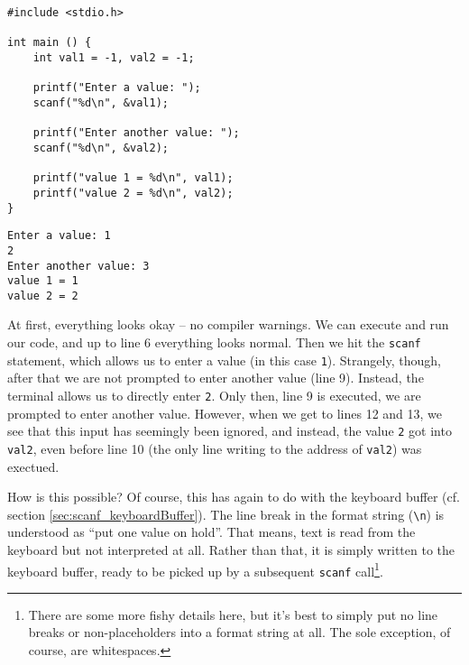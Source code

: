 {\begin{tcbraster}[raster columns=2,
                  raster equal height,
                  nobeforeafter,
                  raster column skip=0.2cm]
\begin{warnbox}[linebreakScanf.c, leftupper=7mm]
\begin{verbatim}
#include <stdio.h>

int main () {
    int val1 = -1, val2 = -1;

    printf("Enter a value: ");
    scanf("%d\n", &val1);

    printf("Enter another value: ");
    scanf("%d\n", &val2);

    printf("value 1 = %d\n", val1);
    printf("value 2 = %d\n", val2);
}
\end{verbatim}
\end{warnbox}
%
\begin{cmdbox}
\begin{verbatim}
Enter a value: 1
2
Enter another value: 3
value 1 = 1
value 2 = 2
\end{verbatim}
\end{cmdbox}
\end{tcbraster}

At first, everything looks okay -- no compiler warnings. We can execute and run our code, and up to line 6 everything looks normal. Then we hit the \texttt{scanf} statement, which allows us to enter a value (in this case \texttt{1}). Strangely, though, after that we are not prompted to enter another value (line 9). Instead, the terminal allows us to directly enter \texttt{2}. Only then, line 9 is executed, \ie we are prompted to enter another value. However, when we get to lines 12 and 13, we see that this input has seemingly been ignored, and instead, the value \texttt{2} got into \texttt{val2}, even before line 10 (the only line writing to the address of \texttt{val2}) was exectued.

How is this possible? Of course, this has again to do with the keyboard buffer (cf. section \ref{sec:scanf_keyboardBuffer}). The line break in the format string (\texttt{\textbackslash n}) is understood as \enquote{put one value on hold}. That means, text is read from the keyboard but not interpreted at all. Rather than that, it is simply written to the keyboard buffer, ready to be picked up by a subsequent \texttt{scanf} call\footnote{There are some more fishy details here, but it's best to simply put no line breaks or non-placeholders into a format string at all. The sole exception, of course, are whitespaces.}.


}
